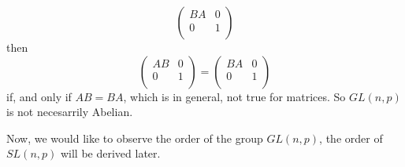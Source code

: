 \begin{example}
\begin{enumerate}
\begin{equation*}
        \begin{pmatrix}
          BA  &   0   \\
          0   &   1   \\
        \end{pmatrix}
      \end{equation*} then
      \begin{equation*}
        \begin{pmatrix}
          AB  &   0   \\
          0   &   1   \\
        \end{pmatrix}=
        \begin{pmatrix}
          BA  &   0   \\
          0   &   1   \\
        \end{pmatrix}
      \end{equation*}
      if, and only if $AB=BA$, which is in general, not true for matrices. So
      $GL(n,p)$ is not necesarrily Abelian.
  \end{enumerate}
\end{example}

Now, we would like to observe the order of the group $GL(n,p)$, the order of
$SL(n,p)$ will be derived later.

